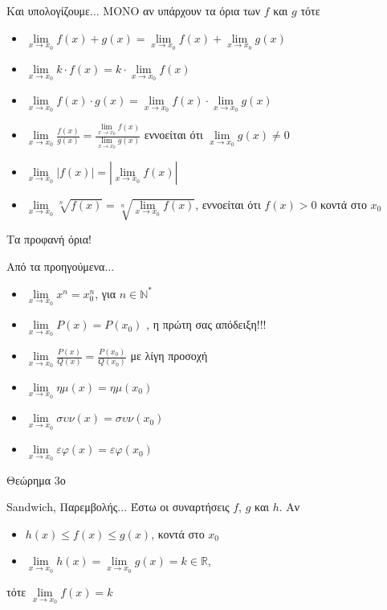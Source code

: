 \documentclass[greek]{beamer}
\begin{document}
\begin{frame}{Και υπολογίζουμε...}
 ΜΟΝΟ αν υπάρχουν τα όρια των $f$ και $g$ τότε
 \begin{itemize}
  \item $\lim\limits_{x \to x_0}{ f(x)+g(x) }=\lim\limits_{x \to x_0}{ f(x) }+\lim\limits_{x \to x_0}{ g(x) }$
  \item $\lim\limits_{x \to x_0}{ k\cdot f(x) }=k\cdot \lim\limits_{x \to x_0}{ f(x) }$
  \item $\lim\limits_{x \to x_0}{ f(x)\cdot g(x) }=\lim\limits_{x \to x_0}{ f(x) }\cdot\lim\limits_{x \to x_0}{ g(x) }$
  \item $\lim\limits_{x \to x_0}{ \frac{f(x)}{g(x)} }=\frac{\lim\limits_{x \to x_0}{ f(x) }}{\lim\limits_{x \to x_0}{ g(x) }}$ εννοείται ότι $\lim\limits_{x \to x_0}{ g(x) }\ne 0$
  \item $\lim\limits_{x \to x_0}{ |f(x)| }=|\lim\limits_{x \to x_0}{ f(x) }|$
  \item $\lim\limits_{x \to x_0}{ \sqrt[n]{f(x)} }=\sqrt[n]{\lim\limits_{x \to x_0}{ f(x) }}$, εννοείται ότι $f(x)>0$ κοντά στο $x_0$
 \end{itemize}
\end{frame}

\begin{frame}{Τα προφανή όρια!}
 \begin{block}{Από τα προηγούμενα...}
  \begin{itemize}
   \item $\lim\limits_{x \to x_0}{ x^n }=x_0^n$, για $n\in \mathbb{N}^*$ \pause
   \item $\lim\limits_{x \to x_0}{ P(x) }=P(x_0)$ \pause, η πρώτη σας απόδειξη!!! \pause
   \item $\lim\limits_{x \to x_0}{ \frac{P(x)}{Q(x)} }=\frac{P(x_0)}{Q(x_0)}$ \pause με λίγη προσοχή \pause
   \item $\lim\limits_{x \to x_0}{ ημ(x) }=ημ(x_0)$ \pause
   \item $\lim\limits_{x \to x_0}{ συν(x) }=συν(x_0)$ \pause
   \item $\lim\limits_{x \to x_0}{ εφ(x) }=εφ(x_0)$
  \end{itemize}
 \end{block}
\end{frame}

\begin{frame}{Θεώρημα 3ο}
 \begin{block}{Sandwich, Παρεμβολής...}
  Έστω οι συναρτήσεις $f$, $g$ και $h$. Αν
  \begin{itemize}
   \item $h(x)\le f(x) \le g(x)$, κοντά στο $x_0$ \pause
   \item $\lim\limits_{x \to x_0}{ h(x) }=\lim\limits_{x \to x_0}{ g(x) }=k \in\mathbb{R}$, \pause
  \end{itemize}
  τότε $\lim\limits_{x \to x_0}{ f(x) }=k$
 \end{block}
\end{frame}
\end{document}
